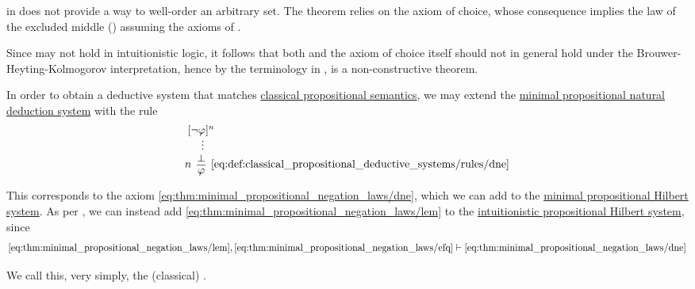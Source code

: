 \begin{example}\label{ex:rem:brouwer_heyting_kolmogorov_interpretation/well_ordering_principle_zfc}
   in \hyperref[def:set]{} does not provide a way to well-order an arbitrary set. The theorem relies on the axiom of choice, whose consequence  implies the law of the excluded middle () assuming the axioms of .

  Since  may not hold in intuitionistic logic, it follows that both  and the axiom of choice itself should not in general hold under the Brouwer-Heyting-Kolmogorov interpretation, hence by the terminology in ,  is a non-constructive theorem.
\end{example}

\begin{definition}\label{def:classical_propositional_deductive_systems}
  In order to obtain a deductive system that matches \hyperref[def:propositional_semantics]{classical propositional semantics}, we may extend the \hyperref[def:minimal_propositional_natural_deduction_system]{minimal propositional natural deduction system} with the rule
  \begin{equation*}\taglabel[\logic{DNE}]{eq:def:classical_propositional_deductive_systems/rules/dne}
    \begin{prooftree}
      \hypo{ [\neg \varphi]^n }
      \ellipsis {} { \bot }
      \infer[left label=\( n \)]1[\ref{eq:def:classical_propositional_deductive_systems/rules/dne}]{ \varphi }
    \end{prooftree}
  \end{equation*}

  This corresponds to the axiom \eqref{eq:thm:minimal_propositional_negation_laws/dne}, which we can add to the \hyperref[def:minimal_propositional_hilbert_system]{minimal propositional Hilbert system}. As per , we can instead add \eqref{eq:thm:minimal_propositional_negation_laws/lem} to the \hyperref[def:intuitionistic_propositional_deductive_systems]{intuitionistic propositional Hilbert system}, since
  \begin{equation*}
    \eqref{eq:thm:minimal_propositional_negation_laws/lem}, \eqref{eq:thm:minimal_propositional_negation_laws/efq} \vdash \eqref{eq:thm:minimal_propositional_negation_laws/dne}
  \end{equation*}

  We call this, very simply, the (classical) .
\end{definition}

